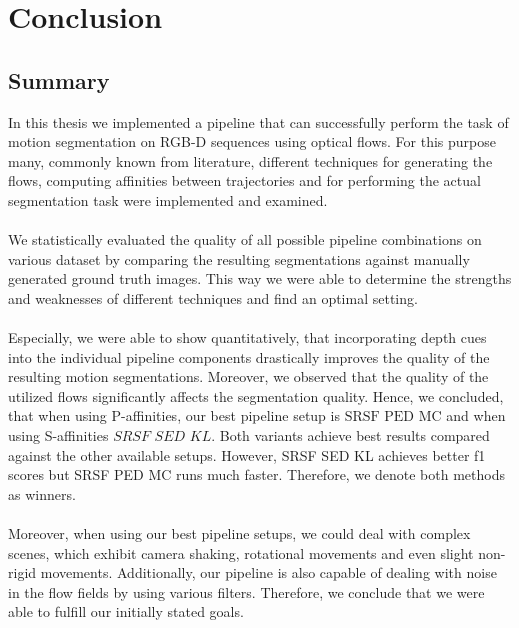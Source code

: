 \chapter{Conclusion}
\section{Summary}
In this thesis we implemented a pipeline that can successfully perform the task of motion segmentation on RGB-D sequences using optical flows. For this purpose many, commonly known from literature, different techniques for generating the flows, computing affinities between trajectories and for performing the actual segmentation task were implemented and examined. \\ \\
We statistically evaluated the quality of all possible pipeline combinations on various dataset by comparing the resulting segmentations against manually generated ground truth images. This way we were able to determine the strengths and weaknesses of different techniques and find an optimal setting. \\ \\
Especially, we were able to show quantitatively, that incorporating depth cues into the individual pipeline components drastically improves the quality of the resulting motion segmentations. Moreover, we observed that the quality of the utilized flows significantly affects the segmentation quality. Hence, we concluded, that when using P-affinities, our best pipeline setup is $\text{SRSF PED MC}$ and when using S-affinities $\textit{SRSF SED KL}$. Both variants achieve best results compared against the other available setups. However, SRSF SED KL achieves better f1 scores but SRSF PED MC runs much faster. Therefore, we denote both methods as winners.  \\ \\
Moreover, when using our best pipeline setups, we could deal with complex scenes, which exhibit camera shaking, rotational movements and even slight non-rigid movements. Additionally, our pipeline is also capable of dealing with noise in the flow fields by using various filters. Therefore, we conclude that we were able to fulfill our initially stated goals. \\ \\

